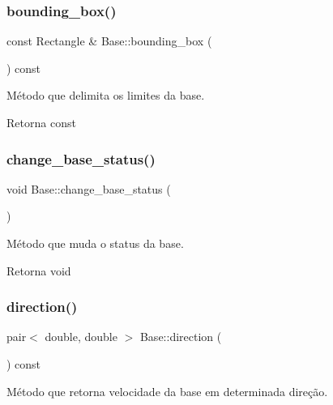 \subsubsection{\texorpdfstring{bounding\+\_\+box()}{bounding\_box()}}
{\footnotesize\ttfamily const Rectangle \& Base\+::bounding\+\_\+box (\begin{DoxyParamCaption}{ }\end{DoxyParamCaption}) const}



Método que delimita os limites da base. 

\begin{DoxyReturn}{Retorna}
const 
\end{DoxyReturn}
\mbox{\label{classBase_af95cdc748f2f72e35ff9e42a8a44eefe}} 
\subsubsection{\texorpdfstring{change\+\_\+base\+\_\+status()}{change\_base\_status()}}
{\footnotesize\ttfamily void Base\+::change\+\_\+base\+\_\+status (\begin{DoxyParamCaption}{ }\end{DoxyParamCaption})\hspace{0.3cm}{\ttfamily [protected]}}



Método que muda o status da base. 

\begin{DoxyReturn}{Retorna}
void 
\end{DoxyReturn}
\mbox{\label{classBase_a77dceab1d1d47769ab4072c18d8fe473}} 
\subsubsection{\texorpdfstring{direction()}{direction()}}
{\footnotesize\ttfamily pair$<$ double, double $>$ Base\+::direction (\begin{DoxyParamCaption}{ }\end{DoxyParamCaption}) const}



Método que retorna velocidade da base em determinada direção. 

